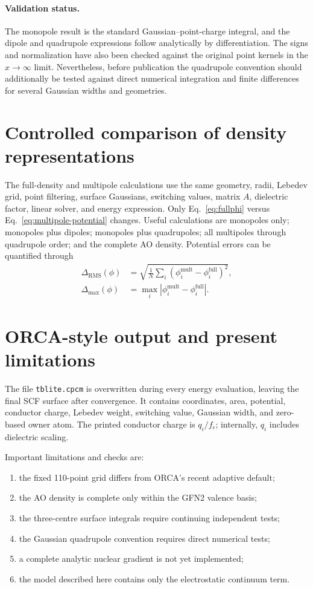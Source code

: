 \documentclass[11pt,a4paper]{article}
\begin{document}
\paragraph{Validation status.}
The monopole result is the standard Gaussian--point-charge integral, and the
dipole and quadrupole expressions follow analytically by differentiation.  The
signs and normalization have also been checked against the original point
kernels in the $x\to\infty$ limit.  Nevertheless, before publication the
quadrupole convention should additionally be tested against direct numerical
integration and finite differences for several Gaussian widths and geometries.

\section{Controlled comparison of density representations}

The full-density and multipole calculations use the same geometry, radii,
Lebedev grid, point filtering, surface Gaussians, switching values, matrix $A$,
dielectric factor, linear solver, and energy expression.  Only
Eq.~\eqref{eq:fullphi} versus Eq.~\eqref{eq:multipole-potential} changes.
Useful calculations are monopoles only; monopoles plus dipoles; monopoles plus
quadrupoles; all multipoles through quadrupole order; and the complete AO
density.  Potential errors can be quantified through
\begin{align}
 \Delta_{\mathrm{RMS}}(\phi)&=
 \sqrt{\frac1N\sum_i(\phi_i^{\mathrm{mult}}-
 \phi_i^{\mathrm{full}})^2},\\
 \Delta_{\max}(\phi)&=\max_i|\phi_i^{\mathrm{mult}}-
 \phi_i^{\mathrm{full}}|.
\end{align}

\section{ORCA-style output and present limitations}

The file \texttt{tblite.cpcm} is overwritten during every energy evaluation,
leaving the final SCF surface after convergence.  It contains coordinates,
area, potential, conductor charge, Lebedev weight, switching value, Gaussian
width, and zero-based owner atom.  The printed conductor charge is
$q_i/f_\epsilon$; internally, $q_i$ includes dielectric scaling.

Important limitations and checks are:
\begin{enumerate}
 \item the fixed 110-point grid differs from ORCA's recent adaptive default;
 \item the AO density is complete only within the GFN2 valence basis;
 \item the three-centre surface integrals require continuing independent tests;
 \item the Gaussian quadrupole convention requires direct numerical tests;
 \item a complete analytic nuclear gradient is not yet implemented;
 \item the model described here contains only the electrostatic continuum term.
\end{enumerate}
\end{document}
